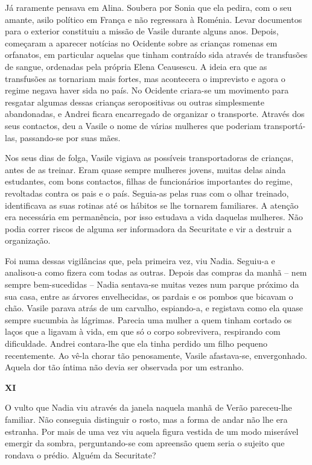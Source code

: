 Já raramente pensava em Alina. Soubera por Sonia que ela pedira, com o
seu amante, asilo político em França e não regressara à Roménia. Levar
documentos para o exterior constituiu a missão de Vasile durante alguns
anos. Depois, começaram a aparecer notícias no Ocidente sobre as
crianças romenas em orfanatos, em particular aquelas
que tinham contraído sida através de transfusões de sangue, ordenadas
pela própria Elena Ceausescu. A ideia era que as transfusões as
tornariam mais fortes, mas acontecera o imprevisto e agora o regime
negava haver sida no país. No Ocidente criara-se um movimento para
resgatar algumas dessas crianças seropositivas ou outras simplesmente
abandonadas, e Andrei ficara encarregado de organizar o transporte.
Através dos seus contactos, deu a Vasile o nome de várias mulheres que
poderiam transportá-las, passando-se por suas mães.

Nos seus dias de folga, Vasile vigiava as possíveis transportadoras de
crianças, antes de as treinar. Eram quase sempre mulheres jovens, muitas
delas ainda estudantes, com bons contactos, filhas de funcionários importantes do regime, revoltadas contra os pais e o país. Seguia-as pelas
ruas com o olhar treinado, identificava as suas rotinas até os hábitos
se lhe tornarem familiares. A atenção era necessária em permanência, por
isso estudava a vida daquelas mulheres. Não podia correr riscos de
alguma ser informadora da Securitate e vir a destruir a organização.

Foi numa dessas vigilâncias que, pela primeira vez, viu Nadia. Seguiu-a
e analisou-a como fizera com todas as outras. Depois das compras da
manhã -- nem sempre bem-sucedidas -- Nadia sentava-se muitas vezes num parque próximo da sua
casa, entre as árvores envelhecidas, os pardais e os pombos que bicavam
o chão. Vasile parava atrás de um carvalho, espiando-a, e registava como
ela quase sempre sucumbia às lágrimas. Parecia uma mulher a quem tinham
cortado os laços que a ligavam à vida,
em que só o corpo sobrevivera, respirando com dificuldade. Andrei
contara-lhe que ela tinha perdido um filho pequeno recentemente. Ao
vê-la chorar tão penosamente, Vasile afastava-se, envergonhado. Aquela
dor tão íntima não devia ser observada por um estranho.


\pagebreak
\vspace*{1.8cm}
\noindent{}\textbf{XI}

\bigskip

O vulto que Nadia viu através da janela naquela manhã de Verão
pareceu-lhe familiar. Não conseguia distinguir o rosto, mas a forma de
andar não lhe era estranha. Por mais de uma vez viu aquela figura
vestida de um modo miserável emergir da sombra, perguntando-se com
apreensão quem seria o sujeito que rondava o prédio. Alguém da
Securitate?

